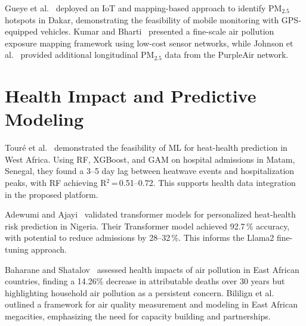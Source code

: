 \documentclass[12pt,a4paper]{report}
\begin{document}
Gueye et al.~\cite{Ahmed_Gueye_2023} deployed an IoT and mapping-based approach to identify PM$_{2.5}$ hotspots in Dakar, demonstrating the feasibility of mobile monitoring with GPS-equipped vehicles. Kumar and Bharti~\cite{Kumar_Sunil_2025} presented a fine-scale air pollution exposure mapping framework using low-cost sensor networks, while Johnson et al.~\cite{Johnson_Olatunji_2022} provided additional longitudinal PM$_{2.5}$ data from the PurpleAir network.

\section{Health Impact and Predictive Modeling}
Touré et al.~\cite{toure2024} demonstrated the feasibility of ML for heat-health prediction in West Africa. Using RF, XGBoost, and GAM on hospital admissions in Matam, Senegal, they found a 3--5 day lag between heatwave events and hospitalization peaks, with RF achieving R$^2$\,=\,0.51--0.72. This supports health data integration in the proposed platform.

Adewumi and Ajayi~\cite{adewumi2025} validated transformer models for personalized heat-health risk prediction in Nigeria. Their Transformer model achieved 92.7\,\% accuracy, with potential to reduce admissions by 28--32\,\%. This informs the Llama2 fine-tuning approach.

Baharane and Shatalov~\cite{Valérien_Baharane_2024} assessed health impacts of air pollution in East African countries, finding a 14.26\% decrease in attributable deaths over 30 years but highlighting household air pollution as a persistent concern. Bililign et al.~\cite{Solomon_Bililign_2024} outlined a framework for air quality measurement and modeling in East African megacities, emphasizing the need for capacity building and partnerships.
\end{document}
